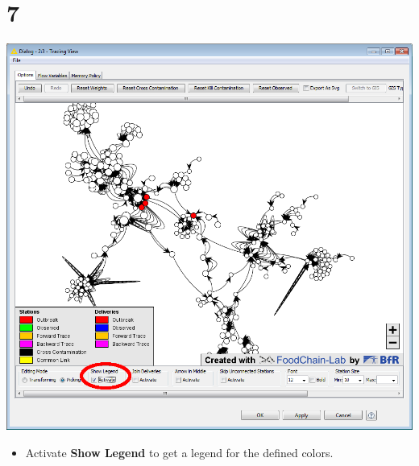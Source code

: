 \documentclass{beamer}
\begin{document}
\section{7}
\begin{frame}
	\begin{center}
  		\includegraphics[height=0.6\textheight]{7.png}
	\end{center}
	\begin{itemize}
		\item Activate \textbf{Show Legend} to get a legend for the defined colors.
	\end{itemize}
\end{frame}
\end{document}

